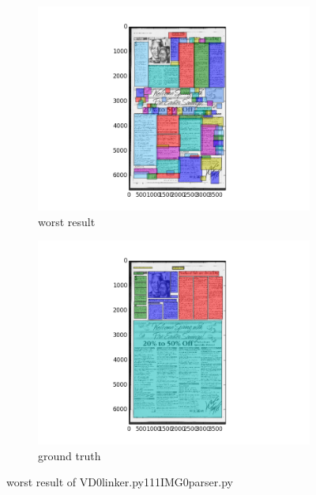 \documentclass[a4paper,10pt]{article}
\begin{document}
					\begin{figure}
					\centering
					\begin{subfigure}{.5\textwidth}
					  \centering
					  \includegraphics[width=10cm]
					{VD0linker.py111IMG0parser.py.worst.png}
					  \caption{worst result}
					  \label{fig:sub1}
					\end{subfigure}%
					\begin{subfigure}{.5\textwidth}
					  \centering
					  \includegraphics[width=10cm]
					{VD0linker.py111IMG0parser.py.gt.worst.png}
					  \caption{ground truth}
					  \label{fig:sub2}
					\end{subfigure}
					\caption
					{worst result of VD0linker.py111IMG0parser.py}
					\label{fig:test}
					\end{figure}
					
\end{document}
